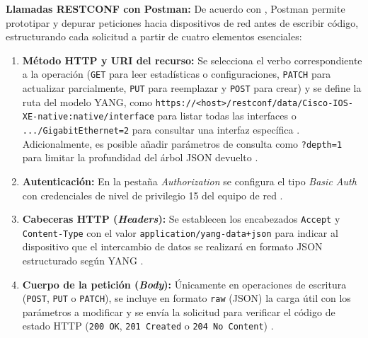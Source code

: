 \documentclass[12pt,a4paper]{article}
\begin{document}
\textbf{Llamadas RESTCONF con Postman:} De acuerdo con \textcite{roman2019}, Postman permite prototipar y depurar peticiones hacia dispositivos de red antes de escribir código, estructurando cada solicitud a partir de cuatro elementos esenciales:
\begin{enumerate}
    \item \textbf{Método HTTP y URI del recurso:} Se selecciona el verbo correspondiente a la operación (\texttt{GET} para leer estadísticas o configuraciones, \texttt{PATCH} para actualizar parcialmente, \texttt{PUT} para reemplazar y \texttt{POST} para crear) y se define la ruta del modelo YANG, como \texttt{https://<host>/restconf/data/Cisco-IOS-XE-native:native/interface} para listar todas las interfaces o \texttt{.../GigabitEthernet=2} para consultar una interfaz específica \parencite{roman2019, cisco_restconf}. Adicionalmente, es posible añadir parámetros de consulta como \texttt{?depth=1} para limitar la profundidad del árbol JSON devuelto \parencite{roman2019}.
    \item \textbf{Autenticación:} En la pestaña \textit{Authorization} se configura el tipo \textit{Basic Auth} con credenciales de nivel de privilegio 15 del equipo de red \parencite{roman2019, cisco_restconf}.
    \item \textbf{Cabeceras HTTP (\textit{Headers}):} Se establecen los encabezados \texttt{Accept} y \texttt{Content-Type} con el valor \texttt{application/yang-data+json} para indicar al dispositivo que el intercambio de datos se realizará en formato JSON estructurado según YANG \parencite{roman2019, cisco_restconf}.
    \item \textbf{Cuerpo de la petición (\textit{Body}):} Únicamente en operaciones de escritura (\texttt{POST}, \texttt{PUT} o \texttt{PATCH}), se incluye en formato \texttt{raw} (JSON) la carga útil con los parámetros a modificar y se envía la solicitud para verificar el código de estado HTTP (\texttt{200 OK}, \texttt{201 Created} o \texttt{204 No Content}) \parencite{roman2019, freecodecamp_postman}.
\end{enumerate}
\end{document}
